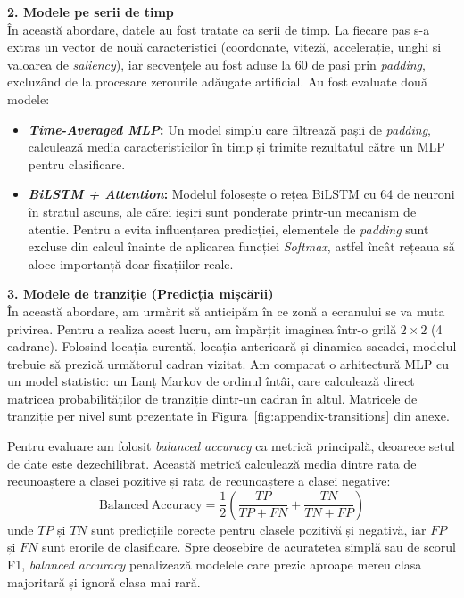 \textbf{2. Modele pe serii de timp} \\
În această abordare, datele au fost tratate ca serii de timp. La fiecare pas s-a extras un vector de nouă caracteristici (coordonate, viteză, accelerație, unghi și valoarea de \emph{saliency}), iar secvențele au fost aduse la 60 de pași prin \emph{padding}, excluzând de la procesare zerourile adăugate artificial. Au fost evaluate două modele:
\begin{itemize}
	\item \textbf{\emph{Time-Averaged MLP}:} Un model simplu care filtrează pașii de \emph{padding}, calculează media caracteristicilor în timp și trimite rezultatul către un MLP pentru clasificare.
	\item \textbf{\emph{BiLSTM + Attention}:} Modelul folosește o rețea BiLSTM cu 64 de neuroni în stratul ascuns, ale cărei ieșiri sunt ponderate printr-un mecanism de atenție. Pentru a evita influențarea predicției, elementele de \emph{padding} sunt excluse din calcul înainte de aplicarea funcției \emph{Softmax}, astfel încât rețeaua să aloce importanță doar fixațiilor reale.
\end{itemize}

\textbf{3. Modele de tranziție (Predicția mișcării)} \\
În această abordare, am urmărit să anticipăm în ce zonă a ecranului se va muta privirea. Pentru a realiza acest lucru, am împărțit imaginea într-o grilă $2 \times 2$ (4 cadrane). Folosind locația curentă, locația anterioară și dinamica sacadei, modelul trebuie să prezică următorul cadran vizitat. Am comparat o arhitectură MLP cu un model statistic: un Lanț Markov de ordinul întâi, care calculează direct matricea probabilităților de tranziție dintr-un cadran în altul. Matricele de tranziție per nivel sunt prezentate în Figura~\ref{fig:appendix-transitions} din anexe.

Pentru evaluare am folosit \emph{balanced accuracy} ca metrică principală, deoarece setul de date este dezechilibrat. Această metrică calculează media dintre rata de recunoaștere a clasei pozitive și rata de recunoaștere a clasei negative:
\[
\mathrm{Balanced\ Accuracy} = \frac{1}{2}\left(\frac{TP}{TP + FN} + \frac{TN}{TN + FP}\right)
\]
unde $TP$ și $TN$ sunt predicțiile corecte pentru clasele pozitivă și negativă, iar $FP$ și $FN$ sunt erorile de clasificare. Spre deosebire de acuratețea simplă sau de scorul F1, \emph{balanced accuracy} penalizează modelele care prezic aproape mereu clasa majoritară și ignoră clasa mai rară.

